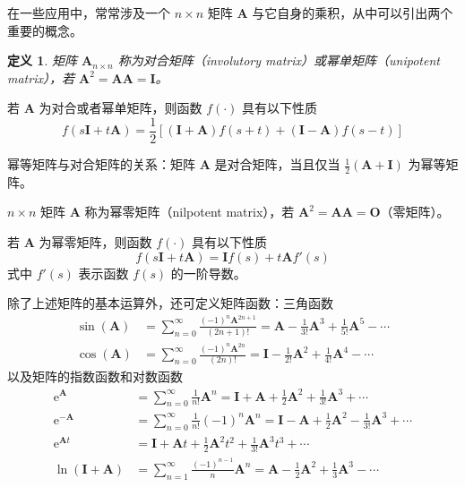 \documentclass[punct=kaiming, fontset=fandol]{ctexbook}
\numberwithin{equation}{section}
\theoremstyle{mystyle}
\newtheorem{defn}{定义}[section]
\def\ee{\symup{e}}
\def\bf#1{\symbfit{#1}}
\def\ee{\mathrm{e}}
\def\bf#1{\bm{#1}}
\begin{document}
  在一些应用中，常常涉及一个 $n \times n$ 矩阵 $\bf A$ 与它自身的乘积，从中可以引出两个重要的概念。
  \begin{defn}
    矩阵 $\bf A_{n \times n}$ 称为对合矩阵（involutory matrix）或幂单矩阵（unipotent matrix），若 $\bf A^2 = \bf A \bf A = \bf I$。
  \end{defn}
  若 $\bf A$ 为对合或者幂单矩阵，则函数 $f(·)$ 具有以下性质\cite{403}
  \begin{equation}
    f(s \bf I + t \bf A) = \frac{1}{2} [ (\bf I + \bf A) f(s+t) + (\bf I - \bf A) f(s-t) ]
  \end{equation}

  幂等矩阵与对合矩阵的关系：矩阵 $\bf A$ 是对合矩阵，当且仅当 $\frac{1}{2} (\bf A + \bf I)$ 为幂等矩阵。

  $n \times n$ 矩阵 $\bf A$ 称为幂零矩阵（nilpotent matrix），若 $\bf A^2 = \bf A \bf A = \bf O$（零矩阵）。

  若 $\bf A$ 为幂零矩阵，则函数 $f(·)$ 具有以下性质\cite{403}
  \begin{equation}
    f(s \bf I + t \bf A) = \bf I f(s) + t \bf A f'(s)
  \end{equation}
  式中 $f'(s)$ 表示函数 $f(s)$ 的一阶导数。

  除了上述矩阵的基本运算外，还可定义矩阵函数：三角函数\cite{403}
  \begin{align}
    \sin(\bf A) &= \sum_{n=0}^{\infty} \frac{(-1)^n \bf A^{2n+1}}{(2n+1)!} = \bf A - \frac{1}{3!} \bf A^3 + \frac{1}{5!} \bf A^5 - \cdots \\
    \cos(\bf A) &= \sum_{n=0}^{\infty} \frac{(-1)^n \bf A^{2n}}{(2n)!} = \bf I - \frac{1}{2!} \bf A^2 + \frac{1}{4!} \bf A^4 - \cdots
  \end{align}
  以及矩阵的指数函数和对数函数\cite{328,198}
  \begin{align}
    \ee^{\bf A}         &= \sum_{n=0}^{\infty} \frac{1}{n!} \bf A^n = \bf I + \bf A + \frac{1}{2} \bf A^2 + \frac{1}{3!} \bf A^3 + \cdots \\
    \ee^{- \bf A}       &= \sum_{n=0}^{\infty} \frac{1}{n!} (-1)^n \bf A^n = \bf I - \bf A + \frac{1}{2} \bf A^2 - \frac{1}{3!} \bf A^3 + \cdots \\
    \ee^{\bf A t}       &= \bf I + \bf A t + \frac{1}{2} \bf A^2 t^2 + \frac{1}{3!} \bf A^3 t^3 + \cdots \\
    \ln(\bf I + \bf A)  &= \sum_{n=1}^{\infty} \frac{(-1)^{n-1}}{n} \bf A^n = \bf A - \frac{1}{2} \bf A^2 + \frac{1}{3} \bf A^3 - \cdots
  \end{align}
\end{document}
